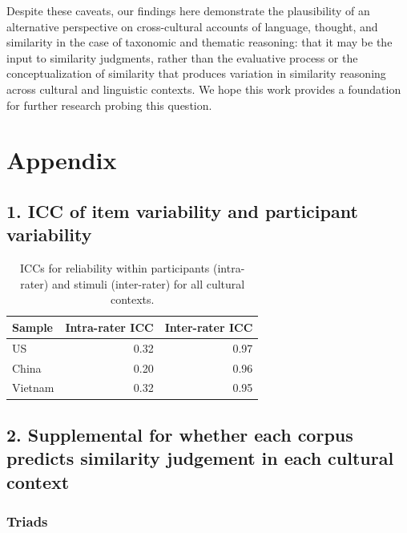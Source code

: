 \documentclass[10pt, letterpaper]{article}
\begin{document}
Despite these caveats, our findings here demonstrate the plausibility of
an alternative perspective on cross-cultural accounts of language,
thought, and similarity in the case of taxonomic and thematic reasoning:
that it may be the input to similarity judgments, rather than the
evaluative process or the conceptualization of similarity that produces
variation in similarity reasoning across cultural and linguistic
contexts. We hope this work provides a foundation for further research
probing this question.

\hypertarget{appendix}{%
\section{Appendix}\label{appendix}}

\hypertarget{icc-of-item-variability-and-participant-variability}{%
\subsection{1. ICC of item variability and participant
variability}\label{icc-of-item-variability-and-participant-variability}}

\begin{table}[ht]
\centering
\begin{tabular}{lrr}
  \hline
Sample & Intra-rater ICC & Inter-rater ICC \\ 
  \hline
US & 0.32 & 0.97 \\ 
  China & 0.20 & 0.96 \\ 
  Vietnam & 0.32 & 0.95 \\ 
   \hline
\end{tabular}
\caption{ICCs for reliability within participants (intra-rater) and stimuli (inter-rater) for all cultural contexts.} 
\end{table}

\hypertarget{supplemental-for-whether-each-corpus-predicts-similarity-judgement-in-each-cultural-context}{%
\subsection{2. Supplemental for whether each corpus predicts similarity
judgement in each cultural
context}\label{supplemental-for-whether-each-corpus-predicts-similarity-judgement-in-each-cultural-context}}

\hypertarget{triads}{%
\subsubsection{Triads}\label{triads}}
\end{document}
